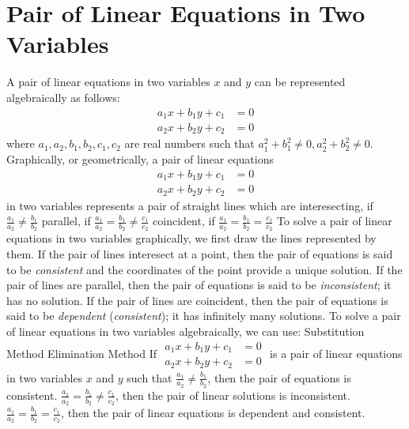 \chapter{Pair of Linear Equations in Two Variables}

\begin{outline}
    \1 A pair of linear equations in two variables $x$ and $y$ can be represented algebraically as follows:
    \begin{align*}
        a_1x + b_1y + c_1 &= 0 \\
        a_2x + b_2y + c_2 &= 0
    \end{align*}
    where $a_1, a_2, b_1, b_2, c_1, c_2$ are real numbers such that $a_1^2 + b_1^2 \ne 0, a_2^2 + b_2^2 \ne 0$.
    \1 Graphically, or geometrically, a pair of linear equations
    \begin{align*}
        a_1x + b_1y + c_1 &= 0 \\
        a_2x + b_2y + c_2 &= 0
    \end{align*}
    in two variables represents a pair of straight lines which are
        \2 interesecting, if $\frac{a_1}{a_2} \ne \frac{b_1}{b_2}$
        \2 parallel, if $\frac{a_1}{a_2} = \frac{b_1}{b_2} \ne \frac{c_1}{c_2}$
        \2 coincident, if $\frac{a_1}{a_2} = \frac{b_1}{b_2} = \frac{c_1}{c_2}$
    \1 To solve a pair of linear equations in two variables graphically, we first draw the lines represented by them.
    \2 If the pair of lines interesect at a point, then the pair of equations is said to be \textit{consistent} and the coordinates of the point provide a unique solution.
    \2 If the pair of lines are parallel, then the pair of equations is said to be \textit{inconsistent}; it has no solution.
    \2 If the pair of lines are coincident, then the pair of equations is said to be \textit{dependent} (\textit{consistent}); it has infinitely many solutions.
    \1 To solve a pair of linear equations in two variables algebraically, we can use:
    \2 Substitution Method
    \2 Elimination Method
    \1 If 
    $
    \begin{aligned}
        a_1x + b_1y + c_1 &= 0 \\
        a_2x + b_2y + c_2 &= 0
    \end{aligned}
    $
    is a pair of linear equations in two variables $x$ and $y$ such that
    \2 $\frac{a_1}{a_2} \ne \frac{b_1}{b_2}$, then the pair of equations is consistent.
    \2 $\frac{a_1}{a_2} = \frac{b_1}{b_2} \ne \frac{c_1}{c_2}$, then the pair of linear solutions is inconsistent.
    \2 $\frac{a_1}{a_2} = \frac{b_1}{b_2} = \frac{c_1}{c_2}$, then the pair of linear equations is dependent and consistent.
\end{outline}
